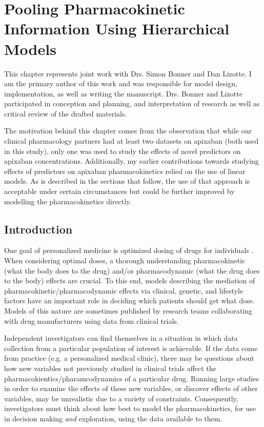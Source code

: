 \chapter{Pooling Pharmacokinetic Information Using Hierarchical Models}


This chapter represents joint work with Drs. Simon Bonner and Dan Lizotte.  I am the primary author of this work and was responsible for model design, implementation, as well as writing the manuscript.  Drs. Bonner and Lizotte participated in conception and planning, and interpretation of research as well as critical review of the drafted materials.

The motivation behind this chapter comes from the observation that while our clinical pharmacology partners had at least two datasets on apixaban (both used in this study), only one was used to study the effects of novel predictors on apixaban concentrations.  Additionally, my earlier contributions towards studying effects of predictors on apixaban pharmacokinetics relied on the use of linear models.  As is described in the sections that follow, the use of that approach is acceptable under certain circumstances but could be further improved by modelling the pharmacokinetics directly. 

\section{Introduction}

One goal of personalized medicine is optimized dosing of drugs for individuals \cite{morse2015personalized}.  When considering optimal doses, a thorough understanding pharmacokinetic (what the body does to the drug) and/or pharmacodynamic (what the drug does to the body) effects are crucial.  To this end, models describing the mediation of pharmacokinetic/pharmacodynamic effects via clinical, genetic, and lifestyle factors have an important role in deciding which patients should get what dose. Models of this nature are sometimes published by research teams collaborating with drug manufacturers using data from clinical trials.

Independent investigators can find themselves in a situation in which data collection from a particular population of interest is achievable. If the data come from practice (e.g. a personalized medical clinic), there may be questions about how new variables not previously studied in clinical trials affect the pharmacokientics/pharamcodynamics of a particular drug.  Running large studies in order to examine the effects of these new variables, or discover effects of other variables, may be unrealistic due to a variety of constraints.  Consequently, investigators must think about how best to model the pharmacokinetics, for use in decision making \textit{and} exploration, using the data available to them.

